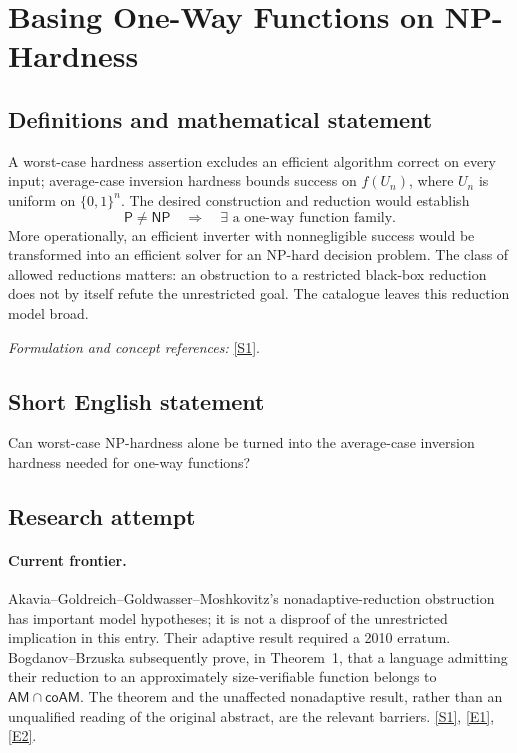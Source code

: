 \documentclass[11pt,a4paper]{article}
\newcommand{\sref}[2]{\hyperlink{source:#1:#2}{[S#2]}}
\newcommand{\eref}[2]{\hyperlink{extra:#1:#2}{[E#2]}}
\newif\ifshowcatalogue
\newcommand{\cataloguescope}[1]{\ifshowcatalogue
 \paragraph{Exact scope in the supplied catalogue.}
 \begin{quote}\small #1\end{quote}\fi}
\numberwithin{equation}{section}
\begin{document}
\setcounter{section}{0}
\clearpage
\section*{\texorpdfstring{Basing One-Way Functions on NP-Hardness}{Basing One-Way Functions on NP-Hardness}}\label{30006686}
\subsection{Definitions and mathematical statement}
A worst-case hardness assertion excludes an efficient algorithm correct on every input; average-case inversion hardness bounds success on $f(U_n)$, where $U_n$ is uniform on $\{0,1\}^n$. The desired construction and reduction would establish
\[
 \mathsf P\ne\mathsf{NP}\quad\Longrightarrow\quad
 \exists\text{ a one-way function family}.
\]
More operationally, an efficient inverter with nonnegligible success would be transformed into an efficient solver for an NP-hard decision problem. The class of allowed reductions matters: an obstruction to a restricted black-box reduction does not by itself refute the unrestricted goal. The catalogue leaves this reduction model broad.
\par\smallskip\textit{Formulation and concept references:} \sref{30006686}{1}.
\cataloguescope{Determine whether one-way functions can be based on NP-hardness, i.e., whether there is a reduction from a worst-case NP-complete (or NP-hard) decision problem to the task of average-case inverting a polynomial-time computable function, so that P != NP would imply the existence of one-way functions.}
\subsection{Short English statement}
Can worst-case NP-hardness alone be turned into the average-case inversion hardness needed for one-way functions?
\subsection{Research attempt}

\paragraph{Current frontier.}
Akavia--Goldreich--Goldwasser--Moshkovitz's nonadaptive-reduction obstruction
has important model hypotheses; it is not a disproof of the unrestricted
implication in this entry. Their adaptive result required a 2010 erratum.
Bogdanov--Brzuska subsequently prove, in Theorem~1, that a language admitting
their reduction to an approximately size-verifiable function belongs to
$\mathsf{AM}\cap\mathsf{coAM}$. The theorem and the unaffected nonadaptive
result, rather than an unqualified reading of the original abstract, are the
relevant barriers. \sref{30006686}{1}, \eref{30006686}{1}, \eref{30006686}{2}.
\end{document}

